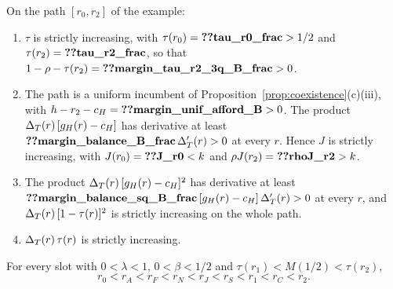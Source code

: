 \begin{lemma}\label{lem:a4-path}
On the path \([r_0,r_2]\) of the example:
\begin{enumerate}[label=(\alph*),leftmargin=2em]
\item \(\tau\) is strictly increasing, with \(\tau(r_0)=\reg{tau_r0_frac}>1/2\) and \(\tau(r_2)=\reg{tau_r2_frac}\), so
that \(1-\rho-\tau(r_2)=\reg{margin_tau_r2_3q_B_frac}>0\).
\item The path is a uniform incumbent of Proposition~\ref{prop:coexistence}(c)(iii), with
\(h-r_2-c_H=\reg{margin_unif_afford_B}>0\). The product \(\Delta_T(r)\,[g_H(r)-c_H]\) has derivative at least
\(\reg{margin_balance_B_frac}\,\DT'(r)>0\) at every \(r\). Hence \(J\) is strictly increasing, with
\(J(r_0)=\reg{J_r0}<k\) and \(\rho J(r_2)=\reg{rhoJ_r2}>k\).
\item The product \(\Delta_T(r)\,[g_H(r)-c_H]^2\) has derivative at least
\(\reg{margin_balance_sq_B_frac}\,[g_H(r)-c_H]\,\DT'(r)>0\) at every \(r\), and \(\Delta_T(r)\,[1-\tau(r)]^2\) is strictly
increasing on the whole path.
\item \(\Delta_T(r)\,\tau(r)\) is strictly increasing.
\end{enumerate}
\end{lemma}

\begin{lemma}\label{lem:a4-order}
For every slot with \(0<\lambda<1\), \(0<\beta<1/2\) and \(\tau(r_1)<M(1/2)<\tau(r_2)\),
\[
r_0<r_A<r_F<r_N<r_J<r_S<r_1<r_C<r_2 .
\]
\end{lemma}

